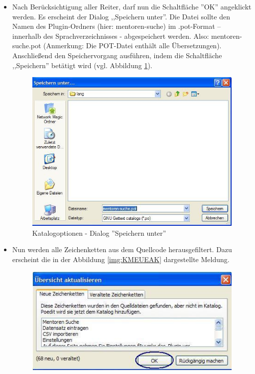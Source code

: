 \begin{enumerate}
\begin{itemize}
   \item Nach Berücksichtigung aller Reiter, darf nun die Schaltfläche ''OK'' angeklickt werden. Es erscheint der Dialog ,,Speichern unter''. Die Datei sollte den Namen des Plugin-Ordners (hier: mentoren-suche) im  .pot-Format – innerhalb des Sprachverzeichnisses - abgespeichert werden. Also: mentoren-suche.pot (Anmerkung: Die \gls{POT}-Datei enthält alle Übersetzungen). Anschließend den Speichervorgang ausführen, indem die Schaltfläche ,,Speichern'' betätigt wird (vgl. Abbildung \ref{img:DSU}).
      \begin{figure}[htbp]
	\begin{center}
	\includegraphics[angle={360}, scale=0.45]{pictures/lok4.jpg}
	    \caption{Katalogoptionen - Dialog ''Speichern unter''}
	    \label{img:DSU}
	\end{center}
   \end{figure}
   \item Nun werden alle Zeichenketten aus dem Quellcode herausgefiltert. Dazu erscheint die in der Abbildung  \ref{img:KMEUEAK} dargestellte Meldung.
     \begin{figure}[htbp]
	\begin{center}
	\includegraphics[angle={360}, scale=0.61]{pictures/lok5.jpg}

\end{center}
\end{figure}
\end{itemize}
\end{enumerate}
